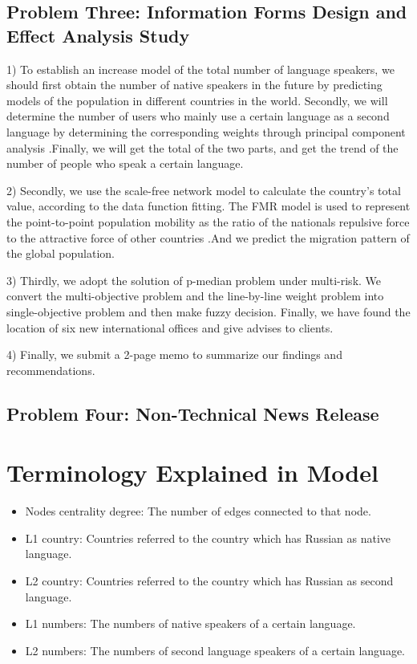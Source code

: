 \subsection{Problem Three: Information Forms Design and Effect Analysis Study}
1) To establish an increase model of the total number of language speakers, we should first obtain the number of native speakers in the future by predicting models of the population in different countries in the world. Secondly, we will determine the number of users who mainly use a certain language as a second language by determining the corresponding weights through principal component analysis .Finally, we will get the total of the two parts, and get the trend of the number of people who speak a certain language.\par 

2) Secondly, we use the scale-free network model to calculate the country's total value, according to the data function fitting. The FMR model is used to represent the point-to-point population mobility as the ratio of the nationals repulsive force to the attractive force of other countries .And we predict the migration pattern of the global population.\par 

3) Thirdly, we adopt the solution of p-median problem under multi-risk. We convert the multi-objective problem and the line-by-line weight problem into single-objective problem and then make fuzzy decision. Finally, we have found the location of six new international offices and give advises to clients.\par 

4) Finally, we submit a 2-page memo to summarize our findings and recommendations.\par 
\subsection{Problem Four:  Non-Technical News Release }

\section{Terminology Explained in Model}
    \begin{itemize}
      \item Nodes centrality degree: The number of edges connected to that node.
      \item L1 country: Countries referred to the country which has Russian as native language.
      \item L2 country: Countries referred to the country which has Russian as second language.
      \item L1 numbers: The numbers of native speakers of a certain language.
      \item L2 numbers: The numbers of second language speakers of a certain language.
    \end{itemize}


